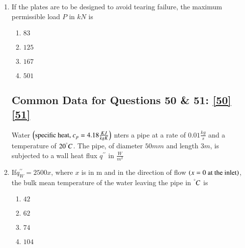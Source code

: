 \documentclass[journal]{IEEEtran}
\numberwithin{equation}{enumi}
\numberwithin{figure}{enumi}
\begin{document}
\begin{enumerate}
    \begin{multicols}{4}
        \begin{enumerate}
            \item $7.50$
            \item $15.00$
            \item $22.50$
            \item $30.00$
        \end{enumerate}
    \end{multicols}

    \item 
    If the plates are to be designed to avoid tearing failure, the maximum permissible load $P$ in $kN$ is \label{49}
    \hfill{}

    \begin{multicols}{4}
        \begin{enumerate}
            \item $83$
            \item $125$
            \item $167$
            \item $501$
        \end{enumerate}
    \end{multicols}

    \subsection{Common Data for Questions 50 \& 51: \ref{50} \ref{51}}

    Water $\left(\text{specific heat, } c_p = 4.18 \frac{KJ}{kgK}\right)$ nters a pipe at a rate of $0.01 \frac{kg}{s}$ and a temperature of $20^\degree C$. The pipe, of diameter $50 mm$ and length $3 m$, is subjected to a wall heat flux $q^{\prime\prime}$ in $\frac{W}{m^2}$\\
    
    \item 
    If$q_W^{\prime\prime} = 2500x $, where $x$ is in m and in the direction of flow $\left(x = 0\text{ at the inlet}\right)$, the bulk mean temperature of the water leaving the pipe in $^\degree C$ is \label{50}
    \hfill{}

    \begin{multicols}{4}
        \begin{enumerate}
            \item $42$
            \item $62$
            \item $74$
            \item $104$
        \end{enumerate}
    \end{multicols}


\end{enumerate}
\end{document}
